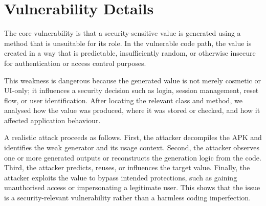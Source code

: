 \section{Vulnerability Details}

The core vulnerability is that a security-sensitive value is generated using a
method that is unsuitable for its role. In the vulnerable code path, the value
is created in a way that is predictable, insufficiently random, or otherwise
insecure for authentication or access control purposes.

This weakness is dangerous because the generated value is not merely cosmetic or
UI-only; it influences a security decision such as login, session management,
reset flow, or user identification. After locating the relevant class and
method, we analysed how the value was produced, where it was stored or checked,
and how it affected application behaviour.

A realistic attack proceeds as follows. First, the attacker decompiles the APK
and identifies the weak generator and its usage context. Second, the attacker
observes one or more generated outputs or reconstructs the generation logic from
the code. Third, the attacker predicts, reuses, or influences the target value.
Finally, the attacker exploits the value to bypass intended protections, such as
gaining unauthorised access or impersonating a legitimate user. This shows that
the issue is a security-relevant vulnerability rather than a harmless coding
imperfection.
